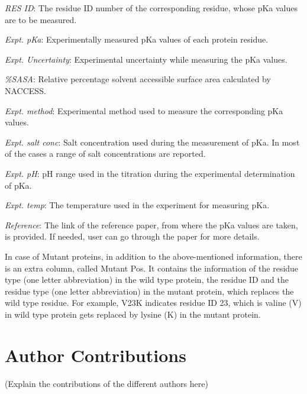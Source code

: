 \documentclass[9pt,tutorial]{livecoms}
\begin{document}
\textit{RES ID}: The residue ID number of the corresponding residue, whose pKa values are to be measured.

\textit{Expt. pKa}: Experimentally measured pKa values of each protein residue.

\textit{Expt. Uncertainty}: Experimental uncertainty while measuring the pKa values.

\textit{\%SASA}: Relative percentage solvent accessible surface area calculated by NACCESS.

\textit{Expt. method}: Experimental method used to measure the corresponding pKa values.

\textit{Expt. salt conc}: Salt concentration used during the measurement of pKa. In most of the cases a range of salt concentrations are reported.

\textit{Expt. pH}: pH range used in the titration during the experimental determination of pKa.

\textit{Expt. temp}: The temperature used in the experiment for measuring pKa.

\textit{Reference}: The link of the reference paper, from where the pKa values are taken, is provided. If needed, user can go through the paper for more details.

In case of Mutant proteins, in addition to the above-mentioned information, there is an extra column, called Mutant Pos. It contains the information of the residue type (one letter abbreviation) in the wild type protein, the residue ID and the residue type (one letter abbreviation) in the mutant protein, which replaces the wild type residue. For example, V23K indicates residue ID 23, which is valine (V) in wild type protein gets replaced by lysine (K) in the mutant protein.


\section{Author Contributions}
%

(Explain the contributions of the different authors here)
\end{document}
